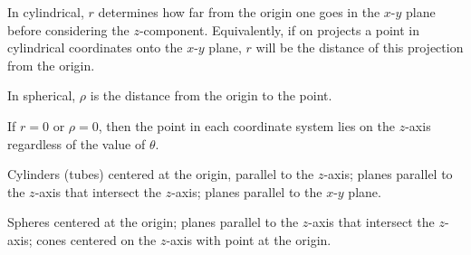\printconcepts

{In cylindrical, $r$ determines how far from the origin one goes in the $x$-$y$ plane before considering the $z$-component. Equivalently, if on projects a point in cylindrical coordinates onto the $x$-$y$ plane, $r$ will be the distance of this projection from the origin.

In spherical, $\rho$ is the distance from the origin to the point.}

{If $r=0$ or $\rho=0$, then the point in each coordinate system lies on the $z$-axis regardless of the value of $\theta$.}

{Cylinders (tubes) centered at the origin, parallel to the $z$-axis; planes parallel to the $z$-axis that intersect the $z$-axis; planes parallel to the $x$-$y$ plane.}

{Spheres centered at the origin; planes parallel to the $z$-axis that intersect the $z$-axis; cones centered on the $z$-axis with point at the origin.}

\printproblems






















